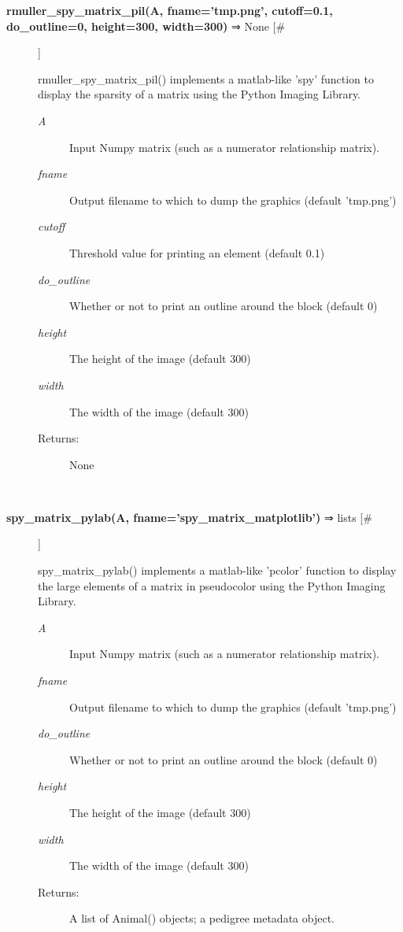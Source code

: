 \documentclass{article}
\begin{document}
\begin{description}
\item[\textbf{rmuller\_spy\_matrix\_pil(A, fname='tmp.png', cutoff=0.1, do\_outline=0, 
height=300, width=300)} ⇒ None [\#]
]
\par rmuller\_spy\_matrix\_pil() implements a matlab-like 'spy' function to display the
sparsity of a matrix using the Python Imaging Library.
\begin{description}
\item[\textit{A}
]
Input Numpy matrix (such as a numerator relationship matrix).
\item[\textit{fname}
]
Output filename to which to dump the graphics (default 'tmp.png')
\item[\textit{cutoff}
]
Threshold value for printing an element (default 0.1)
\item[\textit{do\_outline}
]
Whether or not to print an outline around the block (default 0)
\item[\textit{height}
]
The height of the image (default 300)
\item[\textit{width}
]
The width of the image (default 300)
\item[Returns:
]
None
\end{description}\\

\item[\textbf{spy\_matrix\_pylab(A, fname='spy\_matrix\_matplotlib')} ⇒ lists [\#]
]
\par spy\_matrix\_pylab() implements a matlab-like 'pcolor' function to
display the large elements of a matrix in pseudocolor using the Python Imaging
Library.
\begin{description}
\item[\textit{A}
]
Input Numpy matrix (such as a numerator relationship matrix).
\item[\textit{fname}
]
Output filename to which to dump the graphics (default 'tmp.png')
\item[\textit{do\_outline}
]
Whether or not to print an outline around the block (default 0)
\item[\textit{height}
]
The height of the image (default 300)
\item[\textit{width}
]
The width of the image (default 300)
\item[Returns:
]
A list of Animal() objects; a pedigree metadata object.
\end{description}\\

\end{description}
\end{document}
